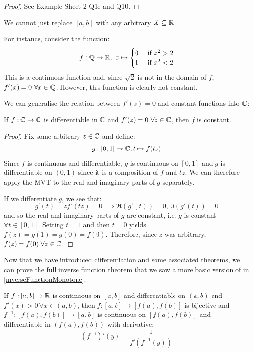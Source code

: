 \documentclass[../main.tex]{subfiles}
\begin{document}
\begin{proof}
  See Example Sheet 2 Q1e and Q10.
\end{proof}
\begin{remark}[Warning]
  We cannot just replace $[a, b]$ with any arbitrary $X \subseteq \mathbb{R}$.

  For instance, consider the function:
  \[
    f: \mathbb{Q} \to \mathbb{R},\
    x \mapsto \begin{cases}
    0 & \text{ if } x^2 > 2 \\
    1 & \text{ if } x^2 < 2
    \end{cases}
  \]
  This is a continuous function and, since $\sqrt{2}$ is not in the domain of $f$, $f'(x) = 0\ \forall x \in \mathbb{Q}$.
  However, this function is clearly not constant.
\end{remark}
We can generalise the relation between $f'(z) = 0$ and constant functions into $\mathbb{C}$:
\begin{corollary}
  If $f: \mathbb{C} \to \mathbb{C}$ is differentiable in $\mathbb{C}$ and $f'(z) = 0\ \forall z \in \mathbb{C}$, then $f$ is constant. \label{constantF}
\end{corollary}
\begin{proof}
  Fix some arbitrary $z \in \mathbb{C}$ and define:
  \[
    g: [0, 1] \to \mathbb{C}, t \mapsto f(tz)
  \]
  Since $f$ is continuous and differentiable, $g$ is continuous on $[0, 1]$ and $g$ is differentiable on $(0, 1)$ since it is a composition of $f$ and $tz$.
  We can therefore apply the MVT to the real and imaginary parts of $g$ separately.

  If we differentiate $g$, we see that:
  \[
    g'(t) = z f'(tz) = 0 \implies \Re(g'(t)) = 0,\ \Im(g'(t)) = 0
  \]
  and so the real and imaginary parts of $g$ are constant, i.e. $g$ is constant $\forall t \in [0, 1]$.
  Setting $t = 1$ and then $t = 0$ yields $f(z) = g(1) = g(0) = f(0)$.
  Therefore, since $z$ was arbitrary, $f(z) = f(0)\ \forall z \in \mathbb{C}$.
\end{proof}
Now that we have introduced differentiation and some associated theorems, we can prove the full inverse function theorem that we saw a more basic version of in \cref{inverseFunctionMonotone}.
\begin{theorem}
  If $f: [a, b] \to \mathbb{R}$ is continuous on $[a, b]$ and differentiable on $(a, b)$ and $f'(x) > 0\ \forall x \in (a, b)$, then $f: [a, b] \to [f(a), f(b)]$ is bijective and $f^{-1} : [f(a), f(b)] \to [a, b]$ is continuous on $[f(a), f(b)]$ and differentiable in $(f(a), f(b))$ with derivative: \label{inverseFunction2}
  \[
    (f^{-1})'(y) = \frac{1}{f'(f^{-1}(y))}
  \]
\end{theorem}
\end{document}
